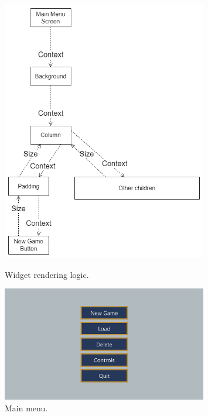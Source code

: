 \begin{figure}[H]
    \centering
    \begin{minipage}{0.45\textwidth}
        \centering
        \includegraphics[width=0.8\textwidth]{chapters/system_architecture/sections/two_dimensional_graphics/resources/widget_logic.drawio.png}
        \caption{Widget rendering logic.}
        \label{fig:widget_logic}
    \end{minipage}\hfill
    \begin{minipage}{0.45\textwidth}
        \centering
        \includegraphics[width=0.8\textwidth]{chapters/system_architecture/sections/two_dimensional_graphics/resources/main-menu.png}
        \caption{Main menu.}
        \label{fig:example_widget}
    \end{minipage}
\end{figure}